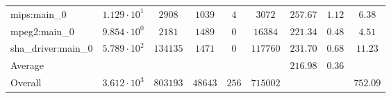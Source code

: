 \begin{tabular}{|l|c|c|c|c|c|c|c|c|}
mips:main\_0            & $ 1.129 \cdot 10^{1}  $ & $ 2908   $ & $ 1039  $ & $ 4   $ & $ 3072   $ & $ 257.67      $ & $ 1.12    $ & $ 6.38    $ \\
mpeg2:main\_0           & $ 9.854 \cdot 10^{0}  $ & $ 2181   $ & $ 1489  $ & $ 0   $ & $ 16384  $ & $ 221.34      $ & $ 0.48    $ & $ 4.51    $ \\
sha\_driver:main\_0     & $ 5.789 \cdot 10^{2}  $ & $ 134135 $ & $ 1471  $ & $ 0   $ & $ 117760 $ & $ 231.70      $ & $ 0.68    $ & $ 11.23   $ \\
\hline
Average                 & $                     $ & $        $ & $       $ & $     $ & $        $ & $ 216.98      $ & $ 0.36    $ & $         $ \\
\hline
Overall                 & $ 3.612 \cdot 10^{3}  $ & $ 803193 $ & $ 48643 $ & $ 256 $ & $ 715002 $ & $             $ & $         $ & $ 752.09  $ \\
\hline
\end{tabular}
